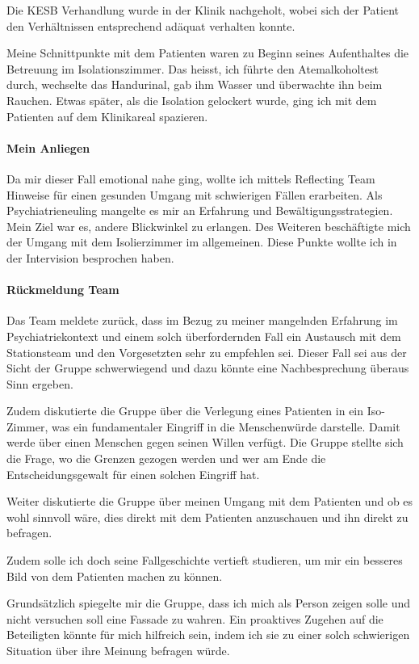 Die KESB Verhandlung wurde in der Klinik nachgeholt, wobei sich der Patient den Verhältnissen entsprechend adäquat verhalten konnte. 

Meine Schnittpunkte mit dem Patienten waren zu Beginn seines Aufenthaltes die Betreuung im Isolationszimmer. Das heisst, ich führte den Atemalkoholtest durch, wechselte das Handurinal, gab ihm Wasser und überwachte ihn beim Rauchen. Etwas später, als die Isolation gelockert wurde, ging ich mit dem Patienten auf dem Klinikareal spazieren. 

\paragraph{Mein Anliegen}
Da mir dieser Fall emotional nahe ging, wollte ich mittels Reflecting Team Hinweise für einen gesunden Umgang mit schwierigen Fällen erarbeiten. Als Psychiatrieneuling mangelte es mir an Erfahrung  und Bewältigungsstrategien. Mein Ziel war es, andere Blickwinkel zu erlangen. Des Weiteren beschäftigte mich der Umgang mit dem Isolierzimmer im allgemeinen. Diese Punkte wollte ich in der Intervision besprochen haben. 

\paragraph{Rückmeldung Team}
Das Team meldete zurück, dass im Bezug zu meiner mangelnden Erfahrung im Psychiatriekontext und einem solch überfordernden Fall ein Austausch mit dem Stationsteam und den Vorgesetzten sehr zu empfehlen sei. Dieser Fall sei aus der Sicht der Gruppe schwerwiegend und dazu könnte eine Nachbesprechung überaus Sinn ergeben.

Zudem diskutierte die Gruppe über die Verlegung eines Patienten in ein Iso-Zimmer, was ein fundamentaler Eingriff in die Menschenwürde darstelle. Damit werde über einen Menschen gegen seinen Willen verfügt. Die Gruppe stellte sich die Frage, wo die Grenzen gezogen werden und wer am Ende die Entscheidungsgewalt für einen solchen Eingriff hat.

Weiter diskutierte die Gruppe über meinen Umgang mit dem Patienten und ob es wohl sinnvoll wäre, dies direkt mit dem Patienten anzuschauen und ihn direkt zu befragen. 

Zudem solle ich doch seine Fallgeschichte vertieft studieren, um mir ein besseres Bild von dem Patienten machen zu können.

Grundsätzlich spiegelte mir die Gruppe, dass ich mich als Person zeigen solle und nicht versuchen soll eine Fassade zu wahren. Ein proaktives Zugehen auf die Beteiligten könnte für mich hilfreich sein, indem ich sie zu einer solch schwierigen Situation über ihre Meinung befragen würde. 

